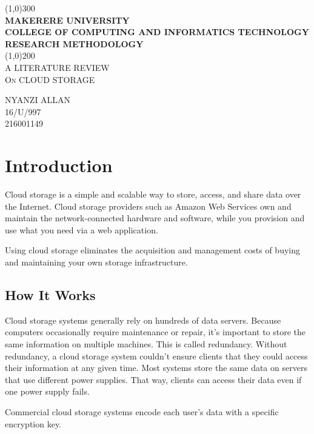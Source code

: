 \documentclass{article}
\begin{document}
 \begin{titlepage}
  \begin{center}
  \line(1,0){300}\\
  [0.25in]
  \huge{\bfseries MAKERERE UNIVERSITY\\
  COLLEGE OF COMPUTING AND INFORMATICS TECHNOLOGY\\
  RESEARCH METHODOLOGY}\\
  [2mm]
  \line(1,0){200}\\
  [1.5cm]
  \textsc{\LARGE A LITERATURE REVIEW }\\
  [0.5CM]
  \textsc{\Large On CLOUD STORAGE}\\
  [2cm]
  \end{center}
  \begin{flushright}
  \textsc{\Large NYANZI ALLAN\\
  16/U/997\\
  216001149\\}
\end{flushright}   
  \end{titlepage}
\section{Introduction}
Cloud storage is a simple and scalable way to store, access, and share data over the Internet. Cloud storage providers such as Amazon Web Services own and maintain the network-connected hardware and software, while you provision and use what you need via a web application.

 Using cloud storage eliminates the acquisition and management costs of buying and maintaining your own storage infrastructure.\cite{r1}
  
  \subsection{How It Works}
  
Cloud storage systems generally rely on hundreds of data servers. Because computers occasionally require maintenance or repair, it's important to store the same information on multiple machines. This is called redundancy. Without redundancy, a cloud storage system couldn't ensure clients that they could access their information at any given time. Most systems store the same data on servers that use different power supplies. That way, clients can access their data even if one power supply fails.\cite{r2}

Commercial cloud storage systems encode each user’s data with a specific encryption key.
\end{document}
